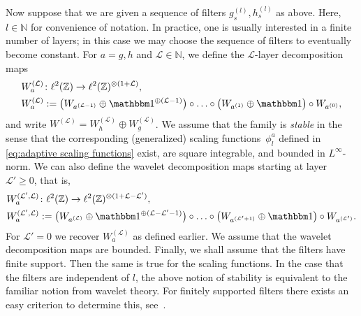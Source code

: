 \documentclass[submission, Phys]{SciPost}
\theoremstyle{definition}
\theoremstyle{remark}
\newcommand{\ZZ}{\mathbb Z}
\newcommand{\NN}{\mathbb N}
\newcommand{\ot}{\otimes}
\newcommand{\op}{\oplus}
\newcommand{\id}{\mathbbm 1}
\newcommand{\cL}{\mathcal L}
\begin{document}
\begin{appendix}
Now suppose that we are given a sequence of filters $g_s^{(l)}, h_s^{(l)}$ as above.
Here, $l\in\NN$ for convenience of notation.
In practice, one is usually interested in a finite number of layers; in this case we may choose the sequence of filters to eventually become constant.
For $a = g, h$ and $\cL\in\NN$, we define the $\cL$-layer decomposition maps
\begin{equation*}\begin{aligned}
  &W_a^{(\cL)} \colon \ell^2(\ZZ) \rightarrow \ell^2(\ZZ)^{\ot (1+\cL)}, \\
  &W_a^{(\cL)} := \bigl( W_{a^{(\cL-1)}} \op \id^{\op (\cL - 1)} \bigr) \circ \ldots  \circ \bigl( W_{a^{(1)}} \op \id \bigr) \circ W_{a^{(0)}},
\end{aligned}\end{equation*}
and write $W^{(\cL)} = W_h^{(\cL)} \op W_g^{(\cL)}$.
We assume that the family is \emph{stable} in the sense that the corresponding (generalized) scaling functions~$\phi^a_l$ defined in \cref{eq:adaptive scaling functions} exist, are square integrable, and bounded in $L^\infty$-norm.
We can also define the wavelet decomposition maps starting at layer~$\cL' \geq 0$, that is,
\begin{equation*}\begin{aligned}
  &W_a^{(\cL',\cL)} \colon \ell^2(\ZZ) \rightarrow \ell^2(\ZZ)^{\ot (1+\cL-\cL')}, \\
  &W_a^{(\cL', \cL)} := \bigl( W_{a^{(\cL)}} \op \id^{\op (\cL-\cL'-1)} \bigr) \circ \ldots  \circ \bigl( W_{a^{(\cL' + 1)}} \op \id \bigr) \circ W_{a^{(\cL')}}.
\end{aligned}\end{equation*}
For $\cL'=0$ we recover $W_a^{(\cL)}$ as defined earlier.
We assume that the wavelet decomposition maps are bounded.
Finally, we shall assume that the filters have finite support.
Then the same is true for the scaling functions.
In the case that the filters are independent of $l$, the above notion of stability is equivalent to the familiar notion from wavelet theory.
For finitely supported filters there exists an easy criterion to determine this, see~\cite{cohen1992biorthogonal}.


\end{appendix}
\end{document}
